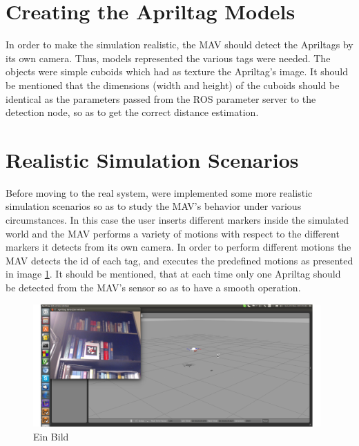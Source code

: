 \section{Creating the Apriltag Models}
\label{sec:cubeRobots}

In order to make the simulation realistic, the MAV should detect the Apriltags by its own camera. Thus, models represented the various tags were needed. The objects were simple cuboids which had as texture the Apriltag's image. It should be mentioned that the dimensions (width and height) of the cuboids should be identical as the parameters passed from the ROS parameter server to the detection node, so as to get the correct distance estimation. 

\section{Realistic Simulation Scenarios}
\label{sec: apriltagFireflySimulation}

Before moving to the real system, were implemented some more realistic simulation scenarios so as to study the MAV's behavior under various circumstances. In this case the user inserts different markers inside the simulated world and the MAV performs a variety of motions with respect to the different markers it detects from its own camera. In order to perform different motions the MAV detects the id of each tag, and executes the predefined motions as presented in image \ref{pics:apriltags_firefly_simulation_screen}.  It should be mentioned, that at each time only one Apriltag should be detected from the MAV's sensor so as to have a smooth operation.

\begin{figure}
   \centering
   \includegraphics[width=0.98\textwidth]{images/apriltags_firefly_simulation_screen.pdf}
   \caption{Ein Bild}
   \label{pics:apriltags_firefly_simulation_screen}
\end{figure}

